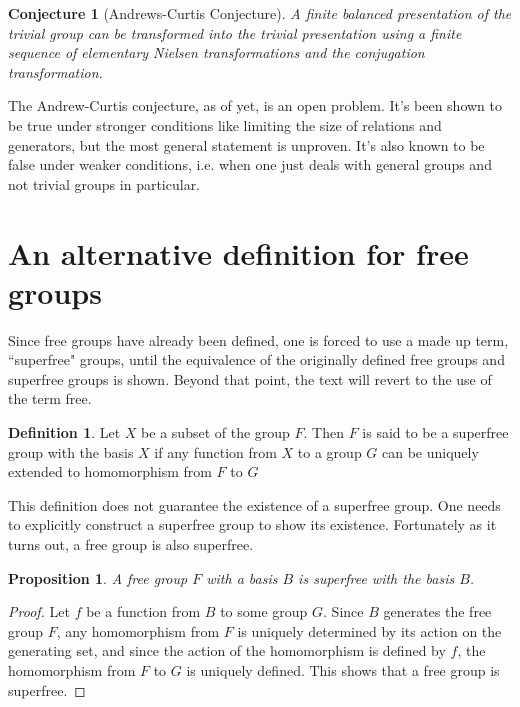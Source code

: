 \documentclass[12pt, titlepage]{article}
\newtheorem{prop}[thm]{Proposition}
\newtheorem{conj}[thm]{Conjecture}
\theoremstyle{definition}
\newtheorem{defn}{Definition}[section]
\begin{document}
\begin{conj}[Andrews-Curtis Conjecture]
A finite balanced presentation of the trivial group can be transformed into the trivial presentation using a finite sequence of elementary Nielsen transformations and the conjugation transformation.
\end{conj}

The Andrew-Curtis conjecture, as of yet, is an open problem. It's been shown to be true under stronger conditions like limiting the size of relations and generators\cite{genetic}, but the most general statement is unproven. It's also known to be false under weaker conditions, i.e. when one just deals with general groups and not trivial groups in particular.

\section{An alternative definition for free groups}

Since free groups have already been defined, one is forced to use a made up term, ``superfree" groups, until the equivalence of the originally defined free groups and superfree groups is shown. Beyond that point, the text will revert to the use of the term free.

\begin{defn}\cite{lyndon}
Let $X$ be a subset of the group $F$. Then $F$ is said to be a superfree group with the basis $X$ if any function from $X$ to a group $G$ can be uniquely extended to homomorphism from $F$ to $G$
\end{defn}

This definition does not guarantee the existence of a superfree group. One needs to explicitly construct a superfree group to show its existence. Fortunately as it turns out, a free group is also superfree.

\begin{prop}
A free group $F$ with a basis $B$ is superfree with the basis $B$.
\end{prop}

\begin{proof}
Let $f$ be a function from $B$ to some group $G$. Since $B$ generates the free group $F$, any homomorphism from $F$ is uniquely determined by its action on the generating set, and since the action of the homomorphism is defined by $f$, the homomorphism from $F$ to $G$ is uniquely defined. This shows that a free group is superfree.
\end{proof}
\end{document}
